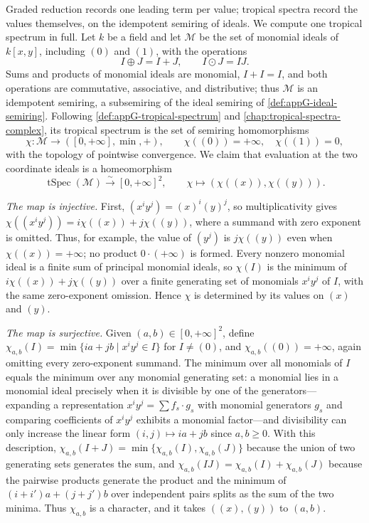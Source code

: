 \begin{example}
\label{ex:monomial-tropical-spectrum}
Graded reduction records one leading term per value; tropical spectra
record the values themselves, on the idempotent semiring of ideals. We
compute one tropical spectrum in full. Let $k$ be a field and let
$\mathscr M$ be the set of monomial ideals of $k[x,y]$, including $(0)$ and
$(1)$, with the operations
\[
 I\oplus J=I+J,\qquad I\odot J=IJ.
\]
Sums and products of monomial ideals are monomial, $I+I=I$, and both
operations are commutative, associative, and distributive; thus
$\mathscr M$ is an idempotent semiring, a subsemiring of the ideal
semiring of \cref{def:appG-ideal-semiring}. Following
\cref{def:appG-tropical-spectrum} and \cref{chap:tropical-spectra-complex},
its tropical spectrum is the set of semiring homomorphisms
\[
 \chi:\mathscr M\longrightarrow([0,+\infty],\min,+),
 \qquad
 \chi((0))=+\infty,\quad\chi((1))=0,
\]
with the topology of pointwise convergence. We claim that evaluation at the
two coordinate ideals is a homeomorphism
\[
 \operatorname{tSpec}(\mathscr M)\xrightarrow{\ \sim\ }[0,+\infty]^2,
 \qquad
 \chi\longmapsto(\chi((x)),\chi((y))).
\]

\emph{The map is injective.} First,
$(x^iy^j)=(x)^i(y)^j$, so multiplicativity gives
$\chi((x^iy^j))=i\chi((x))+j\chi((y))$, where a summand with zero
exponent is omitted. Thus, for example, the value of $(y^j)$ is
$j\chi((y))$ even when $\chi((x))=+\infty$; no product
$0\cdot(+\infty)$ is formed. Every nonzero monomial ideal is a finite sum of principal
monomial ideals, so $\chi(I)$ is the minimum of $i\chi((x))+j\chi((y))$
over a finite generating set of monomials $x^iy^j$ of $I$, with the same
zero-exponent omission. Hence $\chi$ is
determined by its values on $(x)$ and $(y)$.

\emph{The map is surjective.} Given $(a,b)\in[0,+\infty]^2$, define
$\chi_{a,b}(I)=\min\{ia+jb\mid x^iy^j\in I\}$ for $I\ne(0)$, and
$\chi_{a,b}((0))=+\infty$, again omitting every zero-exponent summand.
The minimum over all monomials of $I$ equals
the minimum over any monomial generating set: a monomial lies in a
monomial ideal precisely when it is divisible by one of the generators---%
expanding a representation $x^iy^j=\sum f_s\cdot g_s$ with monomial
generators $g_s$ and comparing coefficients of $x^iy^j$ exhibits a
monomial factor---and divisibility can only increase the linear form
$(i,j)\mapsto ia+jb$ since $a,b\geq0$. With this description,
$\chi_{a,b}(I+J)=\min\{\chi_{a,b}(I),\chi_{a,b}(J)\}$ because the union of
two generating sets generates the sum, and
$\chi_{a,b}(IJ)=\chi_{a,b}(I)+\chi_{a,b}(J)$ because the pairwise products
generate the product and the minimum of $(i+i')a+(j+j')b$ over independent
pairs splits as the sum of the two minima. Thus $\chi_{a,b}$ is a
character, and it takes $((x),(y))$ to $(a,b)$.


\end{example}

